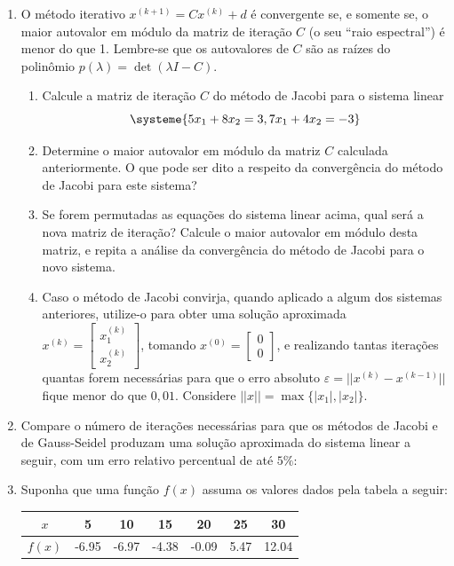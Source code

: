 \documentclass[12pt,a4paper]{article}
\begin{document}
\begin{enumerate}
\item O método iterativo $x^{(k+1)} = C x^{(k)} + d$ é convergente se, e somente se, o maior autovalor em módulo da matriz de iteração $C$ (o seu ``raio espectral'') é menor do que 1. Lembre-se que os autovalores de $C$ são as raízes do polinômio $p( \lambda ) = \det( \lambda I - C)$.
\begin{enumerate}
\item Calcule a matriz de iteração $C$ do método de Jacobi para o sistema linear
\[
\systeme{
5x_1 + 8x_2 =  3,
7x_1 + 4x_2 = -3
}
\]
\item Determine o maior autovalor em módulo da matriz $C$ calculada anteriormente. O que pode ser dito a respeito da convergência do método de Jacobi para este sistema?
\item Se forem permutadas as equações do sistema linear acima, qual será a nova matriz de iteração? Calcule o maior autovalor em módulo desta matriz, e repita a análise da convergência do método de Jacobi para o novo sistema.
\item Caso o método de Jacobi convirja, quando aplicado a algum dos sistemas anteriores, utilize-o para obter uma solução aproximada $x^{(k)} = \begin{bmatrix}
x_1^{(k)}\\ x_2^{(k)}
\end{bmatrix}$, tomando $x^{(0)} = \begin{bmatrix}
0\\ 0
\end{bmatrix}$, e realizando tantas iterações quantas forem necessárias para que o erro absoluto $\varepsilon = || x^{(k)} - x^{(k-1)} ||$ fique menor do que $0,01$. Considere $|| x || = \max\{|x_1|, |x_2|\}$.
\end{enumerate}
\item Compare o número de iterações necessárias para que os métodos de Jacobi e de Gauss-Seidel produzam uma solução aproximada do sistema linear a seguir, com um erro relativo percentual de até $5\%$:

\item Suponha que uma função $f(x)$ assuma os valores dados pela tabela a seguir:
\begin{center}
\begin{tabular}{|c|c|c|c|c|c|c|}
\hline			
   $x$ &  5    & 10     & 15 & 20 & 25 & 30 \\ 
\hline			
$f(x)$ & -6.95 & -6.97  & -4.38 & -0.09 & 5.47 & 12.04\\
\hline			
\end{tabular}
\end{center}


\end{enumerate}
\end{document}
